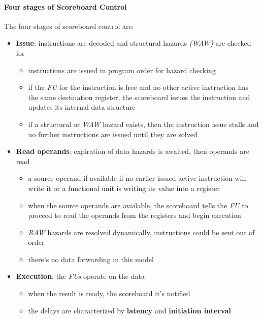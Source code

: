 \documentclass[english]{article}
\begin{document}
\paragraph{Four stages of Scoreboard Control}

The four stages of scoreboard control are:

\begin{itemize}
  \item \textbf{Issue}: instructions are decoded and structural hazards \textit{(WAW)} are checked for
        \begin{itemize}
          \item instructions are issued in program order for hazard checking
          \item if the \textit{FU} for the instruction is free and no other active instruction has the same destination register, the scoreboard issues the instruction and updates its internal data structure
          \item if a structural or \textit{WAW} hazard exists, then the instruction issue stalls and no further instructions are issued until they are solved
        \end{itemize}
  \item \textbf{Read operands}: expiration of data hazards is awaited, then operands are read
        \begin{itemize}
          \item a source operand if available if no earlier issued active instruction will write it or a functional unit is writing its value into a register
          \item when the source operands are available, the scoreboard tells the \textit{FU} to proceed to read the operands from the registers and begin execution
          \item \textit{RAW} hazards are resolved dynamically, instructions could be sent out of order
          \item there's no data forwarding in this model
        \end{itemize}
  \item \textbf{Execution}: the \textit{FUs} operate on the data
        \begin{itemize}
          \item when the result is ready, the scoreboard it's notified
          \item the delays are characterized by \textbf{latency} and \textbf{initiation interval}
        \end{itemize}

\end{itemize}
\end{document}
